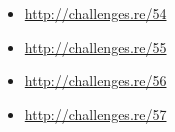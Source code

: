 \sectionold{\Exercises}

\begin{itemize}
	\item \url{http://challenges.re/54}
	\item \url{http://challenges.re/55}
	\item \url{http://challenges.re/56}
	\item \url{http://challenges.re/57}
\end{itemize}

